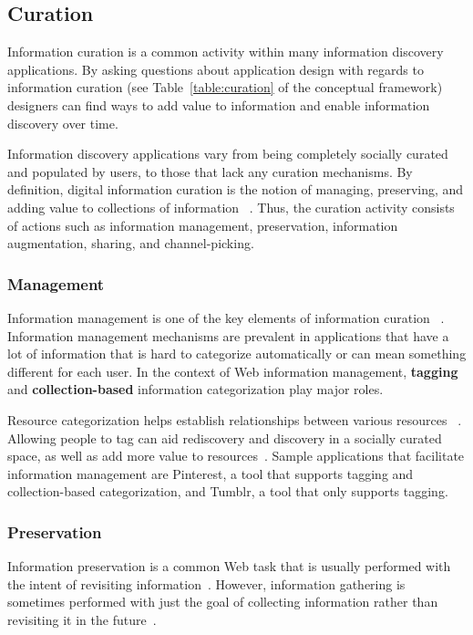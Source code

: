 \documentclass{sigchi}
\begin{document}
{{\subsection{Curation}
Information curation is a common activity within many information discovery applications. By asking questions about application design with regards to information curation (see Table~\ref{table:curation} of the conceptual framework) designers can find ways to add value to information and enable information discovery over time.

Information discovery applications vary from being completely socially curated and populated by users, to those that lack any curation mechanisms. 
By definition, digital information curation is the notion of managing, preserving, and adding value to collections of information ~\cite{beagrie2008digital,whittaker2011personal}. Thus, the curation activity consists of actions such as information management, preservation, information augmentation, sharing, and channel-picking.

{\subsubsection{Management}
Information management is one of the key elements of information curation ~\cite{beagrie2008digital,whittaker2011personal}. Information management mechanisms are prevalent in applications that have a lot of information that is hard to categorize automatically or can mean something different for each user. In the context of Web information management, \textbf{tagging} and \textbf{collection-based} information categorization play major roles.

Resource categorization helps establish relationships between various resources ~\cite{beagrie2008digital,whittaker2011personal}. Allowing people to tag can aid rediscovery and discovery in a socially curated space, as well as add more value to resources~\cite{gruber2007ontology}. Sample applications that facilitate information management are Pinterest, a tool that supports tagging and collection-based categorization, and Tumblr, a tool that only supports tagging.
} %

{\subsubsection{Preservation}
Information preservation is a common Web task that is usually performed with the intent of revisiting information~\cite{abrams1998information,whittaker2011personal}. However, information gathering is sometimes performed with just the goal of collecting information rather than revisiting it in the future~\cite{lindley2012s}. 

}}}
\end{document}
